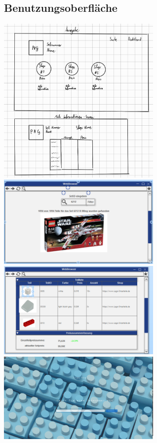 \subsection{Benutzungsoberfläche}
\includegraphics[width=8cm]{pictures/skizzeausgabe.jpg} \newline \newline
\includegraphics[width=8cm]{pictures/programmvorschau1.png}
\includegraphics[width=8cm]{pictures/programmvorschau2.png} \newline \newline
\includegraphics[width=8cm]{pictures/programmvorschau3.png}

